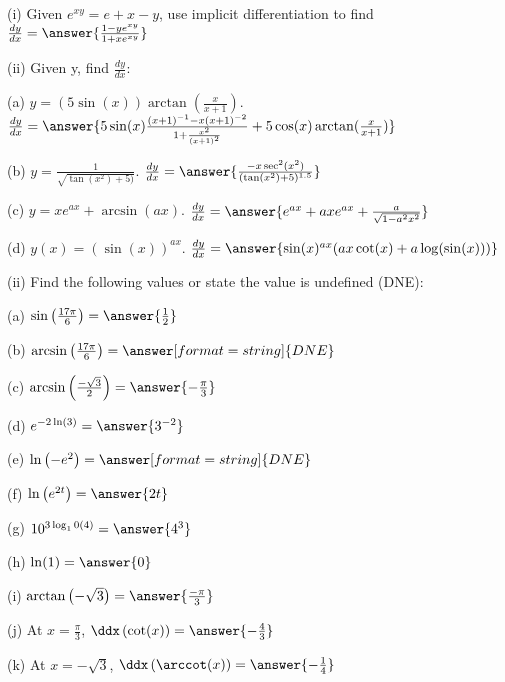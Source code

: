 \documentclass{ximera}
\begin{document}
\begin{exercise}
(i) Given $e^{xy}=e+x-y$, use implicit differentiation to find $\frac{dy}{dx}=\answer{\frac{1-ye^{xy}}{1+xe^{xy}}}$

(ii) Given y, find $\frac{dy}{dx}$:

(a) $y=\left(5\sin(x)\right)\arctan\left(\frac{x}{x+1}\right)$. $\frac{dy}{dx}=\answer{5\sin(x)\frac{(x+1)^{-1}-x(x+1)^{-2}}{1+\frac{x^2}{(x+1)^2}}+5\cos(x)\arctan(\frac{x}{x+1})}$

(b) $y=\frac{1}{\sqrt{\tan(x^2)+5)}}$. $\frac{dy}{dx}=\answer{\frac{-x\sec^2(x^2)}{(\tan(x^2)+5)^{1.5}}}$

(c) $y=xe^{ax}+\arcsin(ax)$. $\frac{dy}{dx}=\answer{e^{ax}+axe^{ax}+\frac{a}{\sqrt{1-a^2x^2}}}$

(d) $y(x)=\left(\sin(x)\right)^{ax}$. $\frac{dy}{dx}=\answer{\sin(x)^{ax}(ax\cot(x)+a\log(\sin(x)))}$

(ii) Find the following values or state the value is undefined (DNE):

(a) $\sin\left(\frac{17\pi}{6}\right)=\answer{\frac{1}{2}}$

(b) $\arcsin\left(\frac{17\pi}{6}\right)=\answer[format=string]{DNE}$

(c) $\arcsin\left(\frac{-\sqrt{3}}{2}\right)=\answer{-\frac{\pi}{3}}$

(d) $e^{-2\ln(3)}=\answer{3^{-2}}$

(e) $\ln\left(-e^2\right)=\answer[format=string]{DNE}$

(f) $\ln\left(e^{2t}\right)=\answer{2t}$

(g) $10^{3\log_10(4)}=\answer{4^3}$

(h) $\ln(1)=\answer{0}$

(i) $\arctan\left(-\sqrt{3}\right)=\answer{\frac{-\pi}{3}}$

(j) At $x=\frac{\pi}{3}$, $\ddx\left(\cot(x)\right)=\answer{-\frac{4}{3}}$

(k) At $x=-\sqrt{3}$, $\ddx\left(\arccot(x)\right)=\answer{-\frac{1}{4}}$
\end{exercise}
\end{document}
